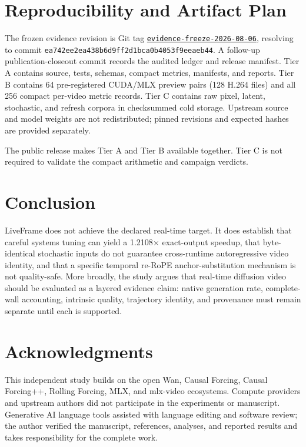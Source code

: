 \documentclass[10pt,twocolumn]{article}
\newcommand{\system}{LiveFrame}
\begin{document}
\section{Reproducibility and Artifact Plan}
The frozen evidence revision is Git tag \href{https://github.com/kkjcodes/liveframe/tree/evidence-freeze-2026-08-06}{\texttt{evidence-freeze-2026-08-06}}, resolving to commit \texttt{ea742ee2ea438b6d9ff2d1bca0b4053f9eeaeb44}. A follow-up publication-closeout commit records the audited ledger and release manifest. Tier A contains source, tests, schemas, compact metrics, manifests, and reports. Tier B contains 64 pre-registered CUDA/MLX preview pairs (128 H.264 files) and all 256 compact per-video metric records. Tier C contains raw pixel, latent, stochastic, and refresh corpora in checksummed cold storage. Upstream source and model weights are not redistributed; pinned revisions and expected hashes are provided separately.

The public release makes Tier A and Tier B available together. Tier C is not required to validate the compact arithmetic and campaign verdicts.

\section{Conclusion}
\system{} does not achieve the declared real-time target. It does establish that careful systems tuning can yield a 1.2108$\times$ exact-output speedup, that byte-identical stochastic inputs do not guarantee cross-runtime autoregressive video identity, and that a specific temporal re-RoPE anchor-substitution mechanism is not quality-safe. More broadly, the study argues that real-time diffusion video should be evaluated as a layered evidence claim: native generation rate, complete-wall accounting, intrinsic quality, trajectory identity, and provenance must remain separate until each is supported.

\section*{Acknowledgments}
This independent study builds on the open Wan, Causal Forcing, Causal Forcing++, Rolling Forcing, MLX, and mlx-video ecosystems. Compute providers and upstream authors did not participate in the experiments or manuscript. Generative AI language tools assisted with language editing and software review; the author verified the manuscript, references, analyses, and reported results and takes responsibility for the complete work.



\end{document}
